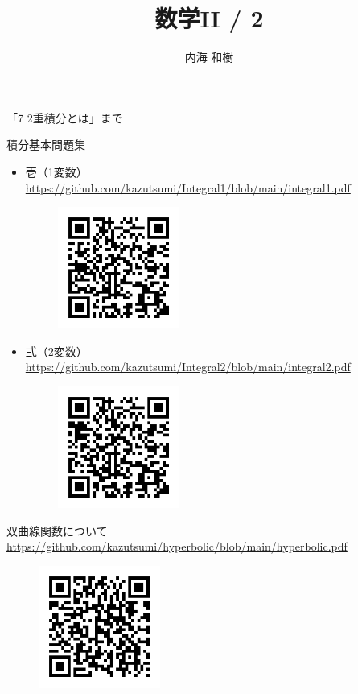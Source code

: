 \documentclass[10pt, uplatex, dvipdfmx]{jsarticle}
\title{\Huge 数学II / 2}
\author{\Large 内海 和樹}
\theoremstyle{definition}
\numberwithin{equation}{section}
\begin{document}
\maketitle

\begin{center}
  「7  \quad 2重積分とは」まで
\end{center}


\thispagestyle{empty}

\clearpage

\begin{center}
  {\LARGE 積分基本問題集}

  \begin{itemize}
    
  \item 壱（1変数） \url{https://github.com/kazutsumi/Integral1/blob/main/integral1.pdf}
    \begin{figure}[h]
      \centering
      \includegraphics[width=4cm]{./pictures/QR/1.png}
    \end{figure}
    
  \item 弍（2変数） \url{https://github.com/kazutsumi/Integral2/blob/main/integral2.pdf}
    \begin{figure}[h]
      \centering
      \includegraphics[width=4cm]{./pictures/QR/2.png}
    \end{figure}
  \end{itemize}

  \vspace{2zh}

  {\LARGE 双曲線関数について}
  \url{https://github.com/kazutsumi/hyperbolic/blob/main/hyperbolic.pdf}
      \begin{figure}[h]
      \centering
      \includegraphics[width=4cm]{./pictures/QR/hyperbolic.png}
    \end{figure}

\end{center}
\end{document}
